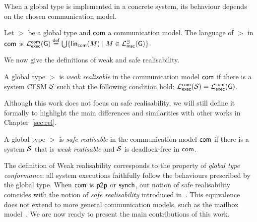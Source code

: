 
When a global type is implemented in a concrete system,
its behaviour depends on the chosen communication model.

\bigskip

\begin{definition}\label{def:global-type-language}
    Let $\gt$ be a global type and $\mathsf{com}$ a communication model. 
    The language of $\gt$ in $\mathsf{com}$ is $
    \mathcal{L}_{\mathsf{exec}}^{\mathsf{com}}(\mathsf{G})\stackrel{\mathsf{def}}{=}
    \bigcup\{\mathsf{lin}_{\mathsf{com}}(M)\mid M\in\mathcal{L}_{\mathsf{msc}}^{\exists}(\mathsf{G})\}$.
\end{definition}

We now give the definitions of weak and safe realisability.

\bigskip

\begin{definition}\label{def:gt-weak-realis}
A global type $\gt$ is \emph{weak realisable} in the
communication model $\mathsf{com}$ if there is a
system CFSM $\mathcal{S}$ such that the following condition hold:
$\mathcal{L}_{\mathsf{exec}}^{\mathsf{com}}(\mathcal{S}) =
\mathcal{L}_{\mathsf{exec}}^{\mathsf{com}}(\mathsf{G})$.
\end{definition}

Although this work does not focus on safe realisability, we will still
define it formally to highlight the main differences and similarities 
with other works in Chapter~\ref{sec:rel}.

\bigskip

\begin{definition}\label{def:gt-safe-realis}
    A global type $\gt$ is \emph{safe realisable}
    in the communication model $\mathsf{com}$
    if there is a system $\mathcal{S}$ that is \emph{weak realisable} and  
    $\mathcal{S}$ is deadlock-free in $\mathsf{com}$.
\end{definition}

The definition of Weak realisability corresponds to  
the property of \emph{global type conformance}: all system executions 
faithfully follow the behaviours prescribed by the global type.
When $\mathsf{com}$ is $\mathsf{p2p}$ or $\mathsf{synch}$, 
our notion of safe realisability coincides with the notion of 
\emph{safe realisability} introduced in~\cite{alur2005realizability}.
This equivalence does not extend to more general communication models, 
such as the mailbox model~\cite{di2025realisability}.
We are now ready to present the main contributions of this work.